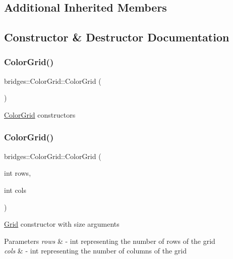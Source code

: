\subsection*{Additional Inherited Members}


\subsection{Constructor \& Destructor Documentation}
\mbox{\label{classbridges_1_1_color_grid_a00f6ca6b903228b78538a9f0511ffe46}} 
\subsubsection{\texorpdfstring{ColorGrid()}{ColorGrid()}\hspace{0.1cm}{\footnotesize\ttfamily [1/4]}}
{\footnotesize\ttfamily bridges\+::\+Color\+Grid\+::\+Color\+Grid (\begin{DoxyParamCaption}{ }\end{DoxyParamCaption})\hspace{0.3cm}{\ttfamily [inline]}}

\mbox{\hyperlink{classbridges_1_1_color_grid}{Color\+Grid}} constructors \mbox{\label{classbridges_1_1_color_grid_ac5fb993701683939d96fd7ac6515efc3}} 
\subsubsection{\texorpdfstring{ColorGrid()}{ColorGrid()}\hspace{0.1cm}{\footnotesize\ttfamily [2/4]}}
{\footnotesize\ttfamily bridges\+::\+Color\+Grid\+::\+Color\+Grid (\begin{DoxyParamCaption}\item[{int}]{rows,  }\item[{int}]{cols }\end{DoxyParamCaption})\hspace{0.3cm}{\ttfamily [inline]}}

\mbox{\hyperlink{classbridges_1_1_grid}{Grid}} constructor with size arguments


\begin{DoxyParams}{Parameters}
{\em rows} & -\/ int representing the number of rows of the grid \\
\hline
{\em cols} & -\/ int representing the number of columns of the grid \\
\hline
\end{DoxyParams}
\mbox{\label{classbridges_1_1_color_grid_a4b731632c040f1fb05636127627603d5}} 
